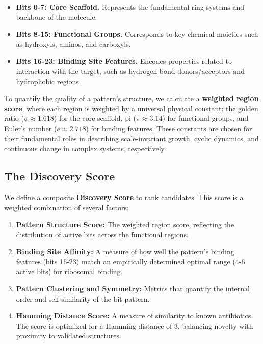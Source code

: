\documentclass[12pt, a4paper]{article}
\begin{document}
\begin{itemize}
    \item \textbf{Bits 0-7: Core Scaffold.} Represents the fundamental ring systems and backbone of the molecule.
    \item \textbf{Bits 8-15: Functional Groups.} Corresponds to key chemical moieties such as hydroxyls, aminos, and carboxyls.
    \item \textbf{Bits 16-23: Binding Site Features.} Encodes properties related to interaction with the target, such as hydrogen bond donors/acceptors and hydrophobic regions.
\end{itemize}

To quantify the quality of a pattern's structure, we calculate a \textbf{weighted region score}, where each region is weighted by a universal physical constant: the golden ratio ($\phi \approx 1.618$) for the core scaffold, pi ($\pi \approx 3.14$) for functional groups, and Euler's number ($e \approx 2.718$) for binding features. These constants are chosen for their fundamental roles in describing scale-invariant growth, cyclic dynamics, and continuous change in complex systems, respectively.

\subsection{The Discovery Score}

We define a composite \textbf{Discovery Score} to rank candidates. This score is a weighted combination of several factors:

\begin{enumerate}
    \item \textbf{Pattern Structure Score:} The weighted region score, reflecting the distribution of active bits across the functional regions.
    \item \textbf{Binding Site Affinity:} A measure of how well the pattern's binding features (bits 16-23) match an empirically determined optimal range (4-6 active bits) for ribosomal binding.
    \item \textbf{Pattern Clustering and Symmetry:} Metrics that quantify the internal order and self-similarity of the bit pattern.
    \item \textbf{Hamming Distance Score:} A measure of similarity to known antibiotics. The score is optimized for a Hamming distance of 3, balancing novelty with proximity to validated structures.
\end{enumerate}
\end{document}
